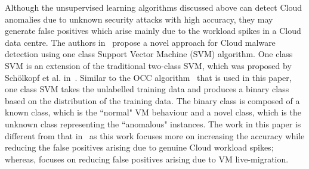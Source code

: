 Although the unsupervised learning algorithms discussed above can detect Cloud anomalies due to unknown security attacks with high accuracy, they may generate false positives which arise mainly due to the workload spikes in a Cloud data centre.
The authors in~\cite{cloud-malware:2016} propose a novel approach for Cloud malware detection using one class Support Vector Machine (SVM) algorithm. One class SVM is an extension of the traditional two-class SVM, which was proposed by Sch\"{o}lkopf et al. in~\cite{one_class_svm:1999}. 
Similar to the OCC algorithm~\cite{OCC:2008} that is used in this paper, one class SVM takes the unlabelled training data and produces a binary class based on the distribution of the training data. The binary class is composed of a known class, which is the ``normal" VM behaviour and a novel class, which is the unknown class representing the ``anomalous" instances. 
The work in this paper is different from that in~\cite{cloud-malware:2016} as this work focuses more on increasing the accuracy while reducing the false positives arising due to genuine Cloud workload spikes; whereas, \cite{cloud-malware:2016} focuses on reducing false positives arising due to VM live-migration.
